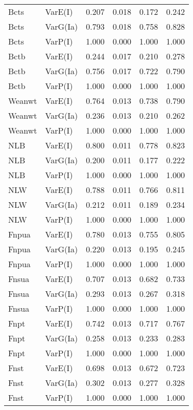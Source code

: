 \begin{center}
\begin{longtable}{|p{0.6in}|p{0.7in}|p{0.6in}|p{0.6in}|p{0.6in}|p{0.6in}|}
  Bcts & VarE(I) & 0.207 & 0.018 & 0.172 & 0.242 \\ 
  Bcts & VarG(Ia) & 0.793 & 0.018 & 0.758 & 0.828 \\ 
  Bcts & VarP(I) & 1.000 & 0.000 & 1.000 & 1.000 \\ 
  Bctb & VarE(I) & 0.244 & 0.017 & 0.210 & 0.278 \\ 
  Bctb & VarG(Ia) & 0.756 & 0.017 & 0.722 & 0.790 \\ 
  Bctb & VarP(I) & 1.000 & 0.000 & 1.000 & 1.000 \\ 
  Weanwt & VarE(I) & 0.764 & 0.013 & 0.738 & 0.790 \\ 
  Weanwt & VarG(Ia) & 0.236 & 0.013 & 0.210 & 0.262 \\ 
  Weanwt & VarP(I) & 1.000 & 0.000 & 1.000 & 1.000 \\ 
  NLB & VarE(I) & 0.800 & 0.011 & 0.778 & 0.823 \\ 
  NLB & VarG(Ia) & 0.200 & 0.011 & 0.177 & 0.222 \\ 
  NLB & VarP(I) & 1.000 & 0.000 & 1.000 & 1.000 \\ 
  NLW & VarE(I) & 0.788 & 0.011 & 0.766 & 0.811 \\ 
  NLW & VarG(Ia) & 0.212 & 0.011 & 0.189 & 0.234 \\ 
  NLW & VarP(I) & 1.000 & 0.000 & 1.000 & 1.000 \\ 
  Fnpua & VarE(I) & 0.780 & 0.013 & 0.755 & 0.805 \\ 
  Fnpua & VarG(Ia) & 0.220 & 0.013 & 0.195 & 0.245 \\ 
  Fnpua & VarP(I) & 1.000 & 0.000 & 1.000 & 1.000 \\ 
  Fnsua & VarE(I) & 0.707 & 0.013 & 0.682 & 0.733 \\ 
  Fnsua & VarG(Ia) & 0.293 & 0.013 & 0.267 & 0.318 \\ 
  Fnsua & VarP(I) & 1.000 & 0.000 & 1.000 & 1.000 \\ 
  Fnpt & VarE(I) & 0.742 & 0.013 & 0.717 & 0.767 \\ 
  Fnpt & VarG(Ia) & 0.258 & 0.013 & 0.233 & 0.283 \\ 
  Fnpt & VarP(I) & 1.000 & 0.000 & 1.000 & 1.000 \\ 
  Fnst & VarE(I) & 0.698 & 0.013 & 0.672 & 0.723 \\ 
  Fnst & VarG(Ia) & 0.302 & 0.013 & 0.277 & 0.328 \\ 
  Fnst & VarP(I) & 1.000 & 0.000 & 1.000 & 1.000 \\ 
   \hline
\end{longtable}
\end{center}
%
